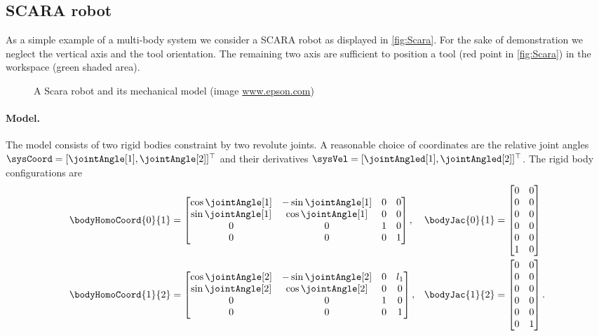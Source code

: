 \subsection{SCARA robot}\label{sec:CtrlScara}
As a simple example of a multi-body system we consider a SCARA robot as displayed in \autoref{fig:Scara}.
For the sake of demonstration we neglect the vertical axis and the tool orientation.
The remaining two axis are sufficient to position a tool (red point in \autoref{fig:Scara}) in the workspace (green shaded area).

\begin{figure}[ht]
 \centering
 
 \caption{A Scara robot and its mechanical model (image \url{www.epson.com})}
 \label{fig:Scara}
\end{figure}

\paragraph{Model.}
The model consists of two rigid bodies constraint by two revolute joints.
A reasonable choice of coordinates are the relative joint angles $\sysCoord = [\jointAngle[1], \jointAngle[2]]^\top$ and their derivatives $\sysVel = [\jointAngled[1], \jointAngled[2]]^\top$.
The rigid body configurations are
\begin{subequations}
\begin{align}
 \bodyHomoCoord{0}{1} &=
 \begin{bmatrix}
  \cos\jointAngle[1] & -\sin\jointAngle[1] & 0 & 0 \\
  \sin\jointAngle[1] &  \cos\jointAngle[1] & 0 & 0 \\
  0 & 0 & 1 & 0 \\
  0 & 0 & 0 & 1
 \end{bmatrix},&
 \bodyJac{0}{1} &= \begin{bmatrix} 0 & 0 \\ 0 & 0 \\ 0 & 0 \\ 0 & 0 \\ 0 & 0 \\ 1 & 0 \end{bmatrix}
\\
 \bodyHomoCoord{1}{2} &=
 \begin{bmatrix}
  \cos\jointAngle[2] & -\sin\jointAngle[2] & 0 & l_1 \\
  \sin\jointAngle[2] &  \cos\jointAngle[2] & 0 & 0 \\
  0 & 0 & 1 & 0 \\
  0 & 0 & 0 & 1
 \end{bmatrix},&
 \bodyJac{1}{2} &= \begin{bmatrix} 0 & 0 \\ 0 & 0 \\ 0 & 0 \\ 0 & 0 \\ 0 & 0 \\ 0 & 1 \end{bmatrix}
 .
\end{align} 
\end{subequations}

